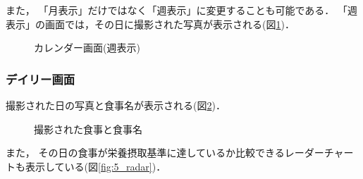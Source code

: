 \documentclass[../report]{subfiles}
\begin{document}
また， 「月表示」だけではなく「週表示」に変更することも可能である．
「週表示」の画面では，その日に撮影された写真が表示される(図\ref{fig:5_calendar-week})．

\begin{figure}[htbp]
    \begin{center}
        \caption{カレンダー画面(週表示)}
        \label{fig:5_calendar-week}
    \end{center}
\end{figure}

\subsubsection{デイリー画面}
撮影された日の写真と食事名が表示される(図\ref{fig:5_meal})．

\begin{figure}[htbp]
    \begin{center}
        \caption{撮影された食事と食事名}
        \label{fig:5_meal}
    \end{center}
\end{figure}

また， その日の食事が栄養摂取基準に達しているか比較できるレーダーチャートも表示している(図\ref{fig:5_radar})．
\end{document}
